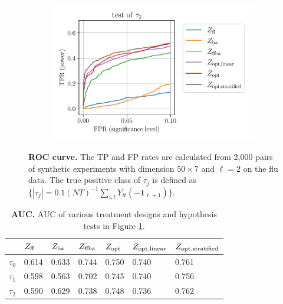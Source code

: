 \begin{figure}[h!]
\begin{subfigure}{0.286\textwidth}
	\end{subfigure}%
	\begin{subfigure}{0.429\textwidth}
		\centering
		\includegraphics[width=1\linewidth]{plots/empirical/flu/nonadaptive/N_50_T_7_lag_2_-0.1_tau2_roc_equal_tau-line-plot.pdf}
	\end{subfigure}
	\caption{\textbf{ROC curve.} The TP and FP rates are calculated from 2,000 pairs of synthetic experiments with dimension $50\times 7$ and $\ell = 2$ on the flu data. The true positive class of $\tau_j$ is defined as $\{|\tau_j| = 0.1(NT)^{-1} \sum_{i,t} Y_{it}(-\bm{1}_{\ell+1})\}$. }
	\label{fig:roc-equal-tau}
\end{figure}

\begin{table}[h!]
    \centering
    {
    \begin{tabular}{l|p{1.5cm}p{1.5cm}p{1.5cm}p{1.5cm}p{1.5cm}p{1.8cm}}
\toprule
 &  $Z_{\mathrm{ff}}$ &  $Z_{\mathrm{ba}}$ &  $Z_{\mathrm{ffba}}$ &  $Z_{\textnormal{opt}}$ &  $Z_{\textnormal{opt},\mathrm{linear}}$ &  $Z_{\textnormal{opt},\mathrm{stratified}}$  \\
\midrule
$\tau_0$   &              0.614 &              0.633 &                0.744 &               0.750 &                      0.740 &                          0.761 \\
$\tau_1$   &              0.598 &              0.563 &                0.702 &               0.745 &                      0.740 &                          0.756 \\
$\tau_2$   &              0.590 &              0.629 &                0.738 &               0.748 &                      0.736 &                          0.762 \\
\bottomrule
\end{tabular}
    }
    \caption{\textbf{AUC.} AUC of various treatment designs and hypothesis tests in Figure \ref{fig:roc-equal-tau}.}
    \label{tab:auc}
\end{table}

